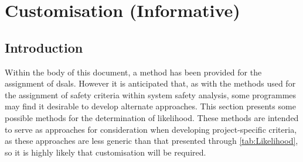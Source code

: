 %
%
\section{ Customisation (Informative)} \label{bkm:DsalCustomisation}


\subsection{Introduction}
Within the body of this document, a method has been provided for the assignment of \glspl{dsal}. However it is anticipated that, as with the methods used for the assignment of safety criteria within system safety analysis, some programmes may find it desirable to develop alternate approaches. This section presents some possible methods for the determination of likelihood. These methods are intended to serve as approaches for consideration when developing project-specific criteria, as these approaches are less generic than that presented through \autoref {tab:Likelihood}, so it is highly likely that customisation will be required.

